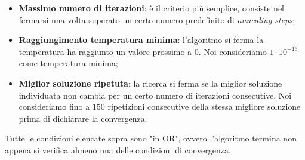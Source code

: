 \begin{itemize}
    \item \textbf{Massimo numero di iterazioni}: è il criterio più semplice, consiste nel fermarsi una volta superato un certo numero predefinito di \textit{annealing steps};
    \item \textbf{Raggiungimento temperatura minima}: l'algoritmo si ferma la temperatura ha raggiunto un valore prossimo a 0. Noi consideriamo $1 \cdot 10^{-16}$ come temperatura minima;
    \item \textbf{Miglior soluzione ripetuta}: la ricerca si ferma se la miglior soluzione individuata non cambia per un certo numero di iterazioni consecutive. Noi consideriamo fino a $150$ ripetizioni consecutive della stessa migliore soluzione prima di dichiarare la convergenza.
\end{itemize}

\noindent Tutte le condizioni elencate sopra sono "in OR", ovvero l'algoritmo termina non appena si verifica almeno una delle condizioni di convergenza.
